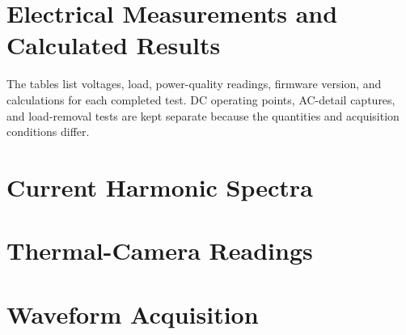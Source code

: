 \section{Electrical Measurements and Calculated Results}
The tables list voltages, load, power-quality readings, firmware version,
and calculations for each completed test. DC
operating points, AC-detail captures, and load-removal tests are kept
separate because the quantities and acquisition conditions differ.


\section{Current Harmonic Spectra}


\section{Thermal-Camera Readings}


\section{Waveform Acquisition}

